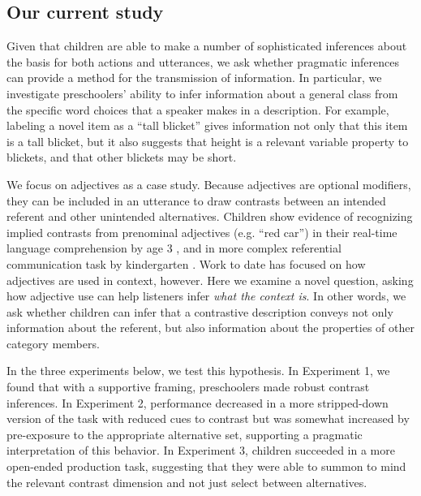 \documentclass[man]{apa2}
\begin{document}
\subsection{Our current study}

Given that children are able to make a number of sophisticated inferences about the basis for both actions and utterances, we ask whether pragmatic inferences can provide a method for the transmission of information. In particular, we investigate preschoolers' ability to infer information about a general class from the specific word choices that a speaker makes in a description. For example, labeling a novel item as a ``tall blicket'' gives information not only that this item is a tall blicket, but it also suggests that height is a relevant variable property to blickets, and that other blickets may be short. 

We focus on adjectives as a case study.  Because adjectives are optional modifiers, they can be included in an utterance to draw contrasts between an intended referent and other unintended alternatives. 
Children show evidence of recognizing implied contrasts from prenominal adjectives (e.g. ``red car'') in their real-time language comprehension by age 3 \cite{fernald2010}, and in more complex referential communication task by kindergarten \cite{nadig2002}. Work to date has focused on how adjectives are used in context, however.  Here we examine a novel question, asking how adjective use can help listeners infer \emph{what the context is}.  In other words, we ask whether children can infer that a contrastive description conveys not only information about the referent, but also information about the properties of other category members.

In the three experiments below, we test this hypothesis. In Experiment 1, we found that with a supportive framing, preschoolers made robust contrast inferences.  In Experiment 2, performance decreased in a more stripped-down version of the task with reduced cues to contrast but was somewhat increased by pre-exposure to the appropriate alternative set, supporting a pragmatic interpretation of this behavior. In Experiment 3, children succeeded in a more open-ended production task, suggesting that they were able to summon to mind the relevant contrast dimension and not just select between alternatives.
\end{document}
